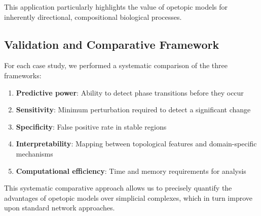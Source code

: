 This application particularly highlights the value of opetopic models for inherently directional, compositional biological processes.

\subsection{Validation and Comparative Framework}
For each case study, we performed a systematic comparison of the three frameworks:

\begin{enumerate}[leftmargin=*]
  \item \textbf{Predictive power}: Ability to detect phase transitions before they occur
  \item \textbf{Sensitivity}: Minimum perturbation required to detect a significant change
  \item \textbf{Specificity}: False positive rate in stable regions
  \item \textbf{Interpretability}: Mapping between topological features and domain-specific mechanisms
  \item \textbf{Computational efficiency}: Time and memory requirements for analysis
\end{enumerate}

This systematic comparative approach allows us to precisely quantify the advantages of opetopic models over simplicial complexes, which in turn improve upon standard network approaches.